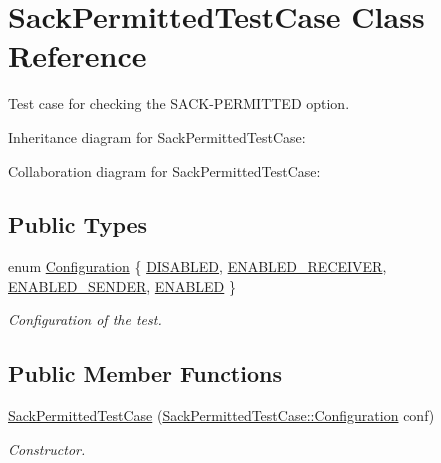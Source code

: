 \hypertarget{classSackPermittedTestCase}{}\section{Sack\+Permitted\+Test\+Case Class Reference}
\label{classSackPermittedTestCase}


Test case for checking the S\+A\+C\+K-\/\+P\+E\+R\+M\+I\+T\+T\+ED option.  




Inheritance diagram for Sack\+Permitted\+Test\+Case\+:


Collaboration diagram for Sack\+Permitted\+Test\+Case\+:
\subsection*{Public Types}
\begin{DoxyCompactItemize}
\item 
enum \hyperlink{classSackPermittedTestCase_a2dc95ae5e965bc36df7ea84c64723493}{Configuration} \{ \hyperlink{classSackPermittedTestCase_a2dc95ae5e965bc36df7ea84c64723493ac7dca56a5fac1080b2ee4d83cfa2005e}{D\+I\+S\+A\+B\+L\+ED}, 
\hyperlink{classSackPermittedTestCase_a2dc95ae5e965bc36df7ea84c64723493a3c0e8b65f47a69fca9d52f403274742c}{E\+N\+A\+B\+L\+E\+D\+\_\+\+R\+E\+C\+E\+I\+V\+ER}, 
\hyperlink{classSackPermittedTestCase_a2dc95ae5e965bc36df7ea84c64723493aef344cc4eec6eedc3e644b86edc4db95}{E\+N\+A\+B\+L\+E\+D\+\_\+\+S\+E\+N\+D\+ER}, 
\hyperlink{classSackPermittedTestCase_a2dc95ae5e965bc36df7ea84c64723493a895f2f11241beaf1334839f4056a0531}{E\+N\+A\+B\+L\+ED}
 \}\begin{DoxyCompactList}\small\item\em Configuration of the test. \end{DoxyCompactList}
\end{DoxyCompactItemize}
\subsection*{Public Member Functions}
\begin{DoxyCompactItemize}
\item 
\hyperlink{classSackPermittedTestCase_a332faf821cca328a29282d3bd052df41}{Sack\+Permitted\+Test\+Case} (\hyperlink{classSackPermittedTestCase_a2dc95ae5e965bc36df7ea84c64723493}{Sack\+Permitted\+Test\+Case\+::\+Configuration} conf)
\begin{DoxyCompactList}\small\item\em Constructor. \end{DoxyCompactList}\end{DoxyCompactItemize}
